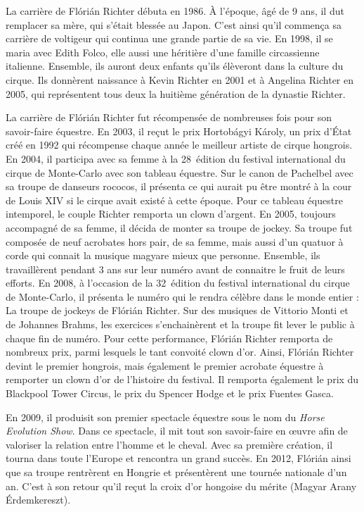 La carrière de Flórián Richter débuta en 1986. À l’épo\-que, âgé de 9 ans, il dut remplacer sa mère, qui s’était blessée au Japon. C’est ainsi qu’il commença sa carrière de voltigeur qui continua une grande partie de sa vie. En 1998, il se maria avec Edith Folco, elle aussi une héritière d’une famille circassienne italienne. Ensemble, ils auront deux enfants qu’ils élèveront dans la culture du cirque. Ils donnèrent naissance à Kevin Richter en 2001 et à Angelina Richter en 2005, qui représentent tous deux la huitième génération de la dynastie Richter.

La carrière de Flórián Richter fut récompensée de nombreuses fois pour son savoir-faire équestre. En 2003, il reçut le prix Hortobágyi Károly, un prix d’État créé en 1992 qui récompense chaque année le meilleur artiste de cirque hongrois. En 2004, il participa avec sa femme à la 28\ieme~édition du festival international du cirque de Monte-Carlo avec son tableau équestre. Sur le canon de Pachelbel avec sa troupe de danseurs rococos, il présenta ce qui aurait pu être montré à la cour de Louis XIV si le cirque avait existé à cette époque. Pour ce tableau équestre intemporel, le couple Richter remporta un clown d’argent. En 2005, toujours accompagné de sa femme, il décida de monter sa troupe de jockey. Sa troupe fut composée de neuf acrobates hors pair, de sa femme, mais aussi d’un quatuor à corde qui connait la musique magyare mieux que personne. Ensemble, ils travaillèrent pendant 3 ans sur leur numéro avant de connaitre le fruit de leurs efforts. En 2008, à l’occasion de la 32\ieme~édition du festival international du cirque de Monte-Carlo, il présenta le numéro qui le rendra célèbre dans le monde entier : La troupe de jockeys de Flórián Richter. Sur des musiques de Vittorio Monti et de Johannes Brahms, les exercices s’enchainèrent et la troupe fit lever le public à chaque fin de numéro. Pour cette performance, Flórián Richter remporta de nombreux prix, parmi lesquels le tant convoité clown d’or. Ainsi, Flórián Richter devint le premier hongrois, mais également le premier acrobate équestre à remporter un clown d’or de l’histoire du festival. Il remporta également le prix du Blackpool Tower Circus, le prix du Spencer Hodge et le prix Fuentes Gasca.

En 2009, il produisit son premier spectacle équestre sous le nom du \textit{Horse Evolution Show}. Dans ce spectacle, il mit tout son savoir-faire en œuvre afin de valoriser la relation entre l’homme et le cheval. Avec sa première création, il tourna dans toute l’Europe et rencontra un grand succès. En 2012, Flórián ainsi que sa troupe rentrèrent en Hongrie et présentèrent une tournée nationale d’un an. C’est à son retour qu’il reçut la croix d’or hongoise du mérite (Magyar Arany Érdemkereszt).

